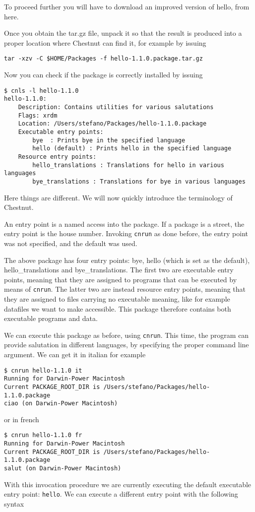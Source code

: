 To proceed further you will have to download an improved version of hello, from
here.

Once you obtain the tar.gz file, unpack it so that the result is produced into
a proper location where Chestnut can find it, for example by issuing

\begin{verbatim}
tar -xzv -C $HOME/Packages -f hello-1.1.0.package.tar.gz
\end{verbatim}

Now you can check if the package is correctly installed by issuing

\begin{verbatim}
$ cnls -l hello-1.1.0
hello-1.1.0:
    Description: Contains utilities for various salutations
    Flags: xrdm
    Location: /Users/stefano/Packages/hello-1.1.0.package
    Executable entry points:
        bye  : Prints bye in the specified language
        hello (default) : Prints hello in the specified language
    Resource entry points:
        hello_translations : Translations for hello in various languages
        bye_translations : Translations for bye in various languages
\end{verbatim}
Here things are different. We will now quickly introduce the terminology of
Chestnut. 

An entry point is a named access into the package. If a package is a
street, the entry point is the house number. Invoking \verb+cnrun+
as done before, the entry point was not specified, and the default was used.

The above package has four entry points: bye, hello (which is set as the
default), hello\_translations and bye\_translations. The first two are executable
entry points, meaning that they are assigned to programs that can be executed
by means of \verb+cnrun+. The latter two are instead resource entry points,
meaning that they are assigned to files carrying no executable meaning, like
for example datafiles we want to make accessible. This package therefore
contains both executable programs and data.

We can execute this package as before, using \verb+cnrun+. This
time, the program can provide salutation in different languages, by specifying
the proper command line argument. We can get it in italian for example

\begin{verbatim}
$ cnrun hello-1.1.0 it
Running for Darwin-Power Macintosh
Current PACKAGE_ROOT_DIR is /Users/stefano/Packages/hello-1.1.0.package
ciao (on Darwin-Power Macintosh)
\end{verbatim}
or in french
\begin{verbatim}
$ cnrun hello-1.1.0 fr
Running for Darwin-Power Macintosh
Current PACKAGE_ROOT_DIR is /Users/stefano/Packages/hello-1.1.0.package
salut (on Darwin-Power Macintosh)
\end{verbatim}
With this invocation procedure we are currently executing the default executable entry point: \verb+hello+. 
We can execute a different entry point with the following syntax

